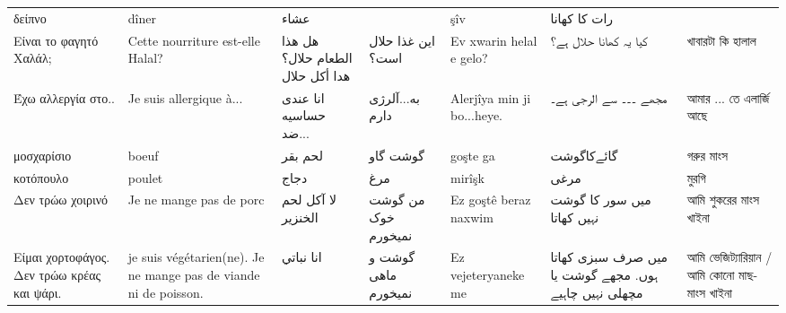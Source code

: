 \begin{longtable}{p{3.5cm} p{3.5cm} p{3.5cm} p{3.5cm} p{3.5cm} p{3.5cm} p{3.5cm} }
 δείπνο                                     & dîner                                                            & عشاء                             &                     & şîv                        & رات کا کهانا                                          &                                             \\
 Είναι το φαγητό Χαλάλ;                     & Cette nourriture est-elle Halal?                                 & هل هذا الطعام حلال؟ هدا أكل حلال & این غذا حلال است؟   & Ev xwarin helal e gelo?    & کیا یہ کھانا حلال ہے؟                                 & খাবারটা কি হালাল                            \\
 Έχω αλλεργία στο..                         & Je suis allergique à...                                          & انا عندی حساسیە ضد...            & به...آلرژی دارم     & Alerjîya min ji bo...heye. & مجھے ۔۔۔ سے الرجی ہے۔                                 & আমার ... তে এলার্জি আছে                     \\
 μοσχαρίσιο                                 & boeuf                                                            & لحم بقر                          & گوشت گاو            & goşte ga                   & گائےکاگوشت                                            & গরুর মাংস                                   \\
 κοτόπουλο                                  & poulet                                                           & دجاج                             & مرغ                 & mirîşk                     & مرغی                                                  & মুরগি                                       \\
 Δεν τρώω χοιρινό                           & Je ne mange pas de porc                                          & لا آكل لحم الخنزير               & من گوشت خوک نمیخورم & Ez goştê beraz naxwim      & میں سور کا گوشت نہیں کھاتا                            & আমি শুকরের মাংস খাইনা                       \\
 Είμαι χορτοφάγος. Δεν τρώω κρέας και ψάρι. & je suis végétarien(ne). Je ne mange pas de viande ni de poisson. & انا نباتي                        & گوشت و ماهی نمیخورم & Ez vejeteryaneke me        & میں صرف سبزی کھاتا ہوں. مجھے گوشت یا مچھلی نہیں چاہیے & আমি ভেজিট্যারিয়ান / আমি কোনো মাছ-মাংস খাইনা \\
\midrule
\bottomrule
\end{longtable}
